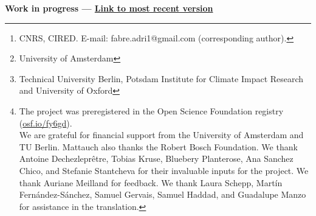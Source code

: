 \author{Adrien Fabre$^{1,2}$, Thomas Douenne$^3$ and Linus Mattauch$^{4,5,6}$} %
\author{Adrien Fabre\footnote{CNRS, CIRED. E-mail: fabre.adri1@gmail.com (corresponding author).}, Thomas Douenne\footnote{University of Amsterdam}\; and Linus Mattauch\footnote{Technical University Berlin, Potsdam Institute for Climate Impact Research and University of Oxford}~~\thanks{The project %
was preregistered in the Open Science Foundation registry (\href{https://osf.io/fy6gd}{osf.io/fy6gd}). \\ We are grateful for financial support from the University of Amsterdam and TU Berlin. Mattauch also thanks the Robert Bosch Foundation. %
We thank Antoine Dechezleprêtre, Tobias Kruse, Bluebery Planterose, Ana Sanchez Chico, and Stefanie Stantcheva for their invaluable inputs for the project. We thank Auriane Meilland for feedback. We thank Laura Schepp, Martín Fernández-Sánchez, Samuel Gervais, Samuel Haddad, and Guadalupe Manzo for assistance in the translation. }} %

\date{\today} %



\maketitle

\begin{center}
{\textbf{Work in progress --- \href{https://github.com/bixiou/global_tax_attitudes/raw/main/paper/US1.pdf}{Link to most recent version}}}
\end{center}



